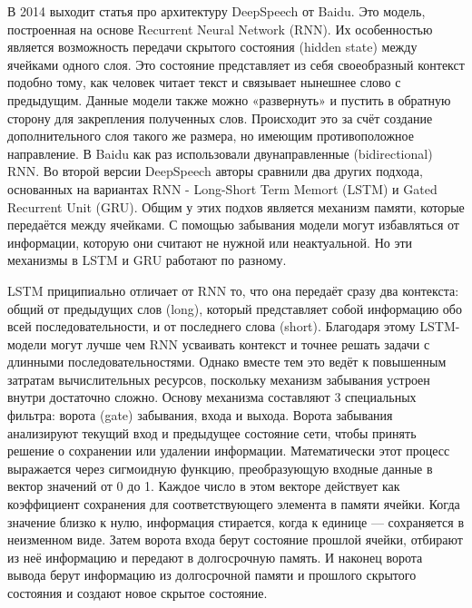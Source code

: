 В 2014 выходит статья про архитектуру DeepSpeech от Baidu. 
Это модель, построенная на основе Recurrent Neural Network (RNN).
Их особенностью является возможность передачи скрытого состояния (hidden state) между ячейками одного слоя.
Это состояние представляет из себя своеобразный контекст подобно тому, как человек читает текст и связывает нынешнее слово с предыдущим.
Данные модели также можно «развернуть» и пустить в обратную сторону для закрепления полученных слов.
Происходит это за счёт создание дополнительного слоя такого же размера, но имеющим противоположное направление.
В Baidu как раз использовали двунаправленные (bidirectional) RNN.
Во второй версии DeepSpeech авторы сравнили два других подхода, основанных на вариантах RNN - Long-Short Term Memort (LSTM) и Gated Recurrent Unit (GRU).
Общим у этих подхов является механизм памяти, которые передаётся между ячейками.
С помощью забывания модели могут избавляться от информации, которую они считают не нужной или неактуальной.
Но эти механизмы в LSTM и GRU работают по разному.

LSTM приципиально отличает от RNN то, что она передаёт сразу два контекста: общий от предыдущих слов (long), который представляет собой информацию обо всей последовательности, и от последнего слова (short).
Благодаря этому LSTM-модели могут лучше чем RNN усваивать контекст и точнее решать задачи с длинными последовательностями.
Однако вместе тем это ведёт к повышенным затратам вычислительных ресурсов, поскольку механизм забывания устроен внутри достаточно сложно.
Основу механизма составляют 3 специальных фильтра: ворота (gate) забывания, входа и выхода.
Ворота забывания анализируют текущий вход и предыдущее состояние сети, чтобы принять решение о сохранении или удалении информации.
Математически этот процесс выражается через сигмоидную функцию, преобразующую входные данные в вектор значений от 0 до 1.
Каждое число в этом векторе действует как коэффициент сохранения для соответствующего элемента в памяти ячейки.
Когда значение близко к нулю, информация стирается, когда к единице — сохраняется в неизменном виде.
Затем ворота входа берут состояние прошлой ячейки, отбирают из неё информацию и передают в долгосрочную память.
И наконец ворота вывода берут информацию из долгосрочной памяти и прошлого скрытого состояния и создают новое скрытое состояние.

